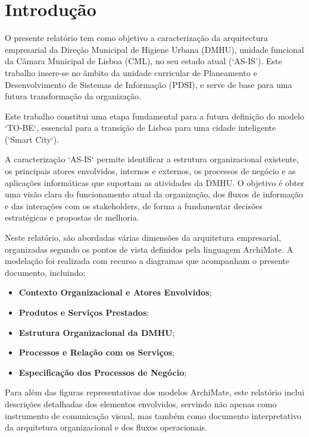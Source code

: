 \documentclass[12pt,a4paper,final]{article}
\begin{document}
    \section*{Introdução}\label{sec:introducao}
    O presente relatório tem como objetivo a caracterização da arquitectura empresarial da Direção Municipal de Higiene Urbana (DMHU), unidade funcional da Câmara Municipal de Lisboa (CML), no seu estado atual (`AS-IS').
    Este trabalho insere-se no âmbito da unidade curricular de Planeamento e Desenvolvimento de Sistemas de Informação (PDSI), e serve de base para uma futura transformação da organização.

    Este trabalho constitui uma etapa fundamental para a futura definição do modelo `TO-BE`, essencial para a transição de Lisboa para uma cidade inteligente (`Smart City`).

    A caracterização `AS-IS` permite identificar a estrutura organizacional existente, os principais atores envolvidos, internos e externos, os processos de negócio e as aplicações informáticas que suportam as atividades da DMHU. O objetivo é obter uma visão clara do funcionamento atual da organização, dos fluxos de informação e das interações com os stakeholders, de forma a fundamentar decisões estratégicas e propostas de melhoria.

    Neste relatório, são abordadas várias dimensões da arquitetura empresarial, organizadas segundo os pontos de vista definidos pela linguagem ArchiMate.
    A modelação foi realizada com recurso a diagramas que acompanham o presente documento, incluindo:

    \begin{itemize}
        \item \textbf{Contexto Organizacional e Atores Envolvidos};
        \item \textbf{Produtos e Serviços Prestados};
        \item \textbf{Estrutura Organizacional da DMHU};
        \item \textbf{Processos e Relação com os Serviços};
        \item \textbf{Especificação dos Processos de Negócio};
    \end{itemize}

    Para além das figuras representativas dos modelos ArchiMate, este relatório inclui descrições detalhadas dos elementos envolvidos, servindo não apenas como instrumento de comunicação visual, mas também como documento interpretativo da arquitetura organizacional e dos fluxos operacionais.
\end{document}
